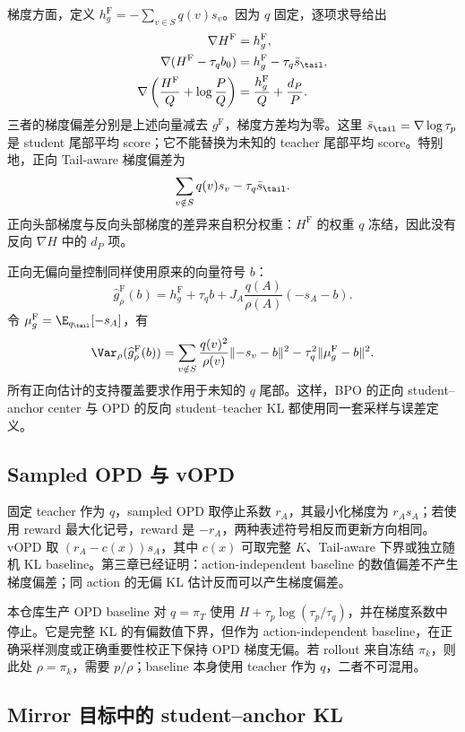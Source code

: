 梯度方面，定义 $h_g^{\mathrm F}=-\sum_{v\in S}q(v)s_v$。因为 $q$ 固定，逐项求导给出
\begin{align*}
 \nabla H^{\mathrm F}&=h_g^{\mathrm F},\\
 \nabla(H^{\mathrm F}-\tau_qb_0)
 &=h_g^{\mathrm F}-\tau_q\bar s_{\tail},\\
 \nabla\left(\frac{H^{\mathrm F}}{Q}+\log\frac P Q\right)
 &=\frac{h_g^{\mathrm F}}{Q}+\frac{d_P}{P}.
\end{align*}
三者的梯度偏差分别是上述向量减去 $g^{\mathrm F}$，梯度方差均为零。这里 $\bar s_{\tail}=\nabla\log\tau_p$ 是 student 尾部平均 score；它不能替换为未知的 teacher 尾部平均 score。特别地，正向 Tail-aware 梯度偏差为
\[
 \sum_{v\notin S}q(v)s_v-\tau_q\bar s_{\tail}.
\]
正向头部梯度与反向头部梯度的差异来自积分权重：$H^{\mathrm F}$ 的权重 $q$ 冻结，因此没有反向 $\nabla H$ 中的 $d_P$ 项。

正向无偏向量控制同样使用原来的向量符号 $b$：
\[
 \widehat g^{\mathrm F}_\rho(b)
 =h_g^{\mathrm F}+\tau_qb
   +J_A\frac{q(A)}{\rho(A)}(-s_A-b).
\]
令 $\mu_g^{\mathrm F}=\E_{q_{\tail}}[-s_A]$，有
\[
 \Var_\rho(\widehat g^{\mathrm F}_\rho(b))
 =\sum_{v\notin S}\frac{q(v)^2}{\rho(v)}\lVert-s_v-b\rVert^2
  -\tau_q^2\lVert\mu_g^{\mathrm F}-b\rVert^2.
\]
所有正向估计的支持覆盖要求作用于未知的 $q$ 尾部。这样，BPO 的正向 student--anchor center 与 OPD 的反向 student--teacher KL 都使用同一套采样与误差定义。

\subsection{Sampled OPD 与 vOPD}

固定 teacher 作为 $q$，sampled OPD 取停止系数 $r_A$，其最小化梯度为 $r_As_A$；若使用 reward 最大化记号，reward 是 $-r_A$，两种表述符号相反而更新方向相同。vOPD 取 $(r_A-c(x))s_A$，其中 $c(x)$ 可取完整 $K$、Tail-aware 下界或独立随机 KL baseline。第三章已经证明：action-independent baseline 的数值偏差不产生梯度偏差；同 action 的无偏 KL 估计反而可以产生梯度偏差。

本仓库生产 OPD baseline 对 $q=\pi_T$ 使用 $H+\tau_p\log(\tau_p/\tau_q)$，并在梯度系数中停止。它是完整 KL 的有偏数值下界，但作为 action-independent baseline，在正确采样测度或正确重要性校正下保持 OPD 梯度无偏。若 rollout 来自冻结 $\pi_k$，则此处 $\rho=\pi_k$，需要 $p/\rho$；baseline 本身使用 teacher 作为 $q$，二者不可混用。

\subsection{Mirror 目标中的 student--anchor KL}

